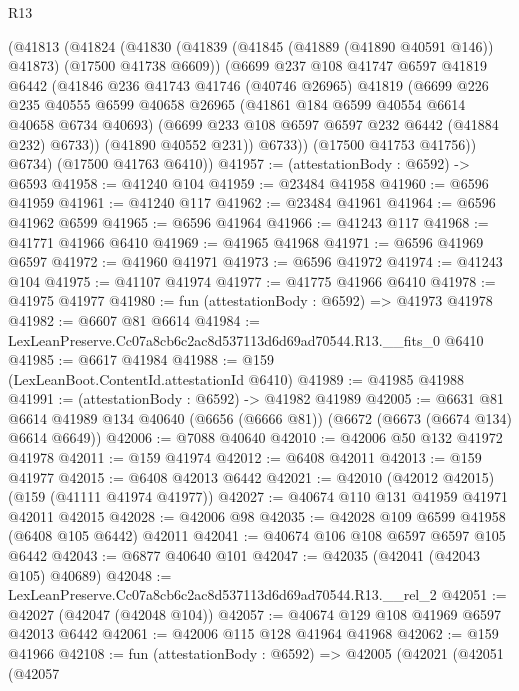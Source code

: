\begin{lexlean}{R13}
\begin{coremodule}
      (@41813
        (@41824
          (@41830
            (@41839 (@41845 (@41889 (@41890 @40591 @146)) @41873) (@17500 @41738 @6609))
            (@6699
              @237
              @108
              @41747
              @6597
              @41819
              @6442
              (@41846
                @236
                @41743
                @41746
                (@40746 @26965)
                @41819
                (@6699
                  @226
                  @235
                  @40555
                  @6599
                  @40658
                  @26965
                  (@41861 @184 @6599 @40554 @6614 @40658 @6734 @40693)
                  (@6699 @233 @108 @6597 @6597 @232 @6442 (@41884 @232) @6733))
                (@41890 @40552 @231))
              @6733))
          (@17500 @41753 @41756))
        @6734)
      (@17500 @41763 @6410))
@41957 := (attestationBody : @6592) -> @6593
@41958 := @41240 @104
@41959 := @23484 @41958
@41960 := @6596 @41959
@41961 := @41240 @117
@41962 := @23484 @41961
@41964 := @6596 @41962 @6599
@41965 := @6596 @41964
@41966 := @41243 @117
@41968 := @41771 @41966 @6410
@41969 := @41965 @41968
@41971 := @6596 @41969 @6597
@41972 := @41960 @41971
@41973 := @6596 @41972
@41974 := @41243 @104
@41975 := @41107 @41974
@41977 := @41775 @41966 @6410
@41978 := @41975 @41977
@41980 := fun (attestationBody : @6592) => @41973 @41978
@41982 := @6607 @81 @6614
@41984 := LexLeanPreserve.Cc07a8cb6c2ac8d537113d6d69ad70544.R13.__fits_0 @6410
@41985 := @6617 @41984
@41988 := @159 (LexLeanBoot.ContentId.attestationId @6410)
@41989 := @41985 @41988
@41991 := (attestationBody : @6592) -> @41982 @41989
@42005 := @6631
    @81
    @6614
    @41989
    @134
    @40640
    (@6656 (@6666 @81))
    (@6672 (@6673 (@6674 @134) @6614 @6649))
@42006 := @7088 @40640
@42010 := @42006 @50 @132 @41972 @41978
@42011 := @159 @41974
@42012 := @6408 @42011
@42013 := @159 @41977
@42015 := @6408 @42013 @6442
@42021 := @42010 (@42012 @42015) (@159 (@41111 @41974 @41977))
@42027 := @40674 @110 @131 @41959 @41971 @42011 @42015
@42028 := @42006 @98
@42035 := @42028 @109 @6599 @41958 (@6408 @105 @6442) @42011
@42041 := @40674 @106 @108 @6597 @6597 @105 @6442
@42043 := @6877 @40640 @101
@42047 := @42035 (@42041 (@42043 @105) @40689)
@42048 := LexLeanPreserve.Cc07a8cb6c2ac8d537113d6d69ad70544.R13.__rel_2
@42051 := @42027 (@42047 (@42048 @104))
@42057 := @40674 @129 @108 @41969 @6597 @42013 @6442
@42061 := @42006 @115 @128 @41964 @41968
@42062 := @159 @41966
@42108 := fun (attestationBody : @6592) =>
  @42005
    (@42021
      (@42051
        (@42057

\end{coremodule}
\end{lexlean}
